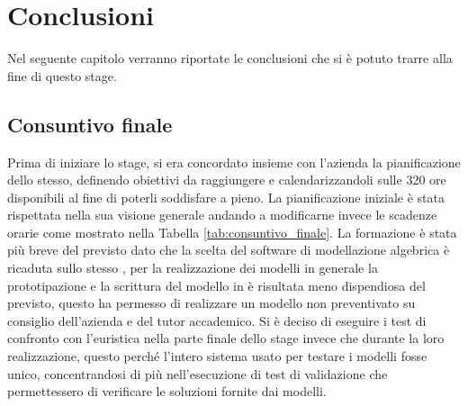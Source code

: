 
\hypertarget{(chap:capitolo8)}{}
\chapter{Conclusioni}
Nel seguente capitolo verranno riportate le conclusioni che si è potuto trarre alla fine di questo stage.
\section{Consuntivo finale}
Prima di iniziare lo stage, si era concordato insieme con l'azienda la pianificazione dello stesso, definendo obiettivi da raggiungere e calendarizzandoli sulle 320 ore disponibili al fine di poterli soddisfare a pieno. La pianificazione iniziale è stata rispettata nella sua visione generale andando a modificarne invece le scadenze orarie come mostrato nella Tabella \ref{tab:consuntivo_finale}. La formazione è stata più breve del previsto dato che la scelta del software di modellazione algebrica è ricaduta sullo stesso , per la realizzazione dei modelli in generale la prototipazione e la scrittura del modello in  è risultata meno dispendiosa del previsto, questo ha permesso di realizzare un modello non preventivato su consiglio dell'azienda e del tutor accademico.
Si è deciso di eseguire i test di confronto con l'euristica nella parte finale dello stage invece che durante la loro realizzazione, questo perché l'intero sistema usato per testare i modelli fosse unico, concentrandosi di più nell'esecuzione di test di validazione che permettessero di verificare le soluzioni fornite dai modelli.

